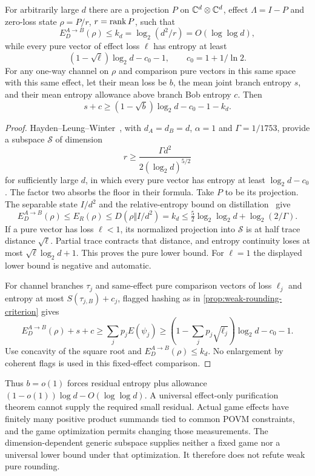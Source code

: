 \begin{proposition}\label{prop:effect-only-obstruction}
For arbitrarily large $d$ there are a projection $P$ on $\mathbb C^d\otimes\mathbb C^d$, effect $\Lambda=I-P$ and zero-loss state $\rho=P/r$, $r=\operatorname{rank} P$, such that
\[
 E_D^{A\to B}(\rho)\le k_d=\log_2(d^2/r)=O(\log\log d),
\]
while every pure vector of effect loss $\ell$ has entropy at least
\[
 (1-\sqrt\ell)\log_2d-c_0-1,\qquad c_0=1+1/\ln2.
\]
For any one-way channel on $\rho$ and comparison pure vectors in this same space with this same effect, let their mean loss be $b$, the mean joint branch entropy $s$, and their mean entropy allowance above branch Bob entropy $c$. Then
\[
 s+c\ge(1-\sqrt b)\log_2d-c_0-1-k_d.
\]
\end{proposition}
\begin{proof}
Hayden--Leung--Winter~\cite[Theorem~IV.1]{HLW06}, with $d_A=d_B=d$, $\alpha=1$ and $\Gamma=1/1753$, provide a subspace $\mathcal S$ of dimension
\[
 r\ge\frac{\Gamma d^2}{2(\log_2d)^{5/2}}
\]
for sufficiently large $d$, in which every pure vector has entropy at least $\log_2d-c_0$. The factor two absorbs the floor in their formula. Take $P$ to be its projection. The separable state $I/d^2$ and the relative-entropy bound on distillation~\cite{VP98} give
\[
 E_D^{A\to B}(\rho)\le E_R(\rho)
 \le D(\rho\Vert I/d^2)=k_d
 \le\tfrac52\log_2\log_2d+\log_2(2/\Gamma).
\]
If a pure vector has loss $\ell<1$, its normalized projection into $\mathcal S$ is at half trace distance $\sqrt\ell$. Partial trace contracts that distance, and entropy continuity loses at most $\sqrt\ell\log_2d+1$. This proves the pure lower bound. For $\ell=1$ the displayed lower bound is negative and automatic.

For channel branches $\tau_j$ and same-effect pure comparison vectors of loss $\ell_j$ and entropy at most $S(\tau_{j,B})+c_j$, flagged hashing as in \cref{prop:weak-rounding-criterion} gives
\[
 E_D^{A\to B}(\rho)+s+c\ge\sum_jp_jE(\psi_j)
 \ge(1-\sum_jp_j\sqrt{\ell_j})\log_2d-c_0-1.
\]
Use concavity of the square root and $E_D^{A\to B}(\rho)\le k_d$. No enlargement by coherent flags is used in this fixed-effect comparison.
\end{proof}

Thus $b=o(1)$ forces residual entropy plus allowance $(1-o(1))\log d-O(\log\log d)$. A universal effect-only purification theorem cannot supply the required small residual. Actual game effects have finitely many positive product summands tied to common POVM constraints, and the game optimization permits changing those measurements. The dimension-dependent generic subspace supplies neither a fixed game nor a universal lower bound under that optimization. It therefore does not refute weak pure rounding.
